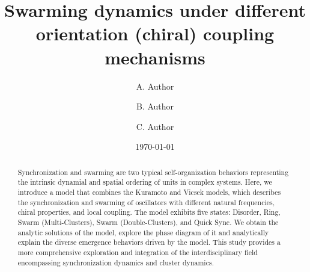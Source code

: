\documentclass[%
 aip,
 amsmath,amssymb,
 reprint,%
]{revtex4-1}
\begin{document}

\title[Swarming dynamics under different orientation (chiral) coupling mechanisms]{Swarming dynamics under different orientation (chiral) coupling mechanisms\\ \;}
\author{A. Author}
\author{B. Author}%
%

\author{C. Author}
%

\date{\today}%

\begin{abstract}
    Synchronization and swarming are two typical self-organization behaviors representing the intrinsic dynamial and spatial ordering of units in complex systems. Here, we introduce a model that combines the Kuramoto and Vicsek models, which describes the synchronization and swarming of oscillators with different natural frequencies, chiral properties, and local coupling. The model exhibits five states: Disorder, Ring, Swarm (Multi-Clusters), Swarm (Double-Clusters), and Quick Sync. We obtain the analytic solutions of the model, explore the phase diagram of it and analytically explain the diverse emergence behaviors driven by the model. This study provides a more comprehensive exploration and integration of the interdisciplinary field encompassing synchronization dynamics and cluster dynamics.
\end{abstract}

\maketitle

\end{document}
